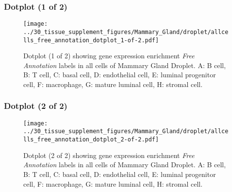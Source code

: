\subsubsection{Dotplot (1 of 2)}
\begin{figure}[h]
\centering
\texttt{[image: ../30\_tissue\_supplement\_figures/Mammary\_Gland/droplet/allcells\_free\_annotation\_dotplot\_1-of-2.pdf]}

\caption{ Dotplot (1 of 2)  showing gene expression enrichment \emph{Free Annotation} labels in all cells of Mammary Gland Droplet. A: B cell, B: T cell, C: basal cell, D: endothelial cell, E: luminal progenitor cell, F: macrophage, G: mature luminal cell, H: stromal cell.}
\end{figure}


\clearpage

\subsubsection{Dotplot (2 of 2)}
\begin{figure}[h]
\centering
\texttt{[image: ../30\_tissue\_supplement\_figures/Mammary\_Gland/droplet/allcells\_free\_annotation\_dotplot\_2-of-2.pdf]}

\caption{ Dotplot (2 of 2)  showing gene expression enrichment \emph{Free Annotation} labels in all cells of Mammary Gland Droplet. A: B cell, B: T cell, C: basal cell, D: endothelial cell, E: luminal progenitor cell, F: macrophage, G: mature luminal cell, H: stromal cell.}
\end{figure}


